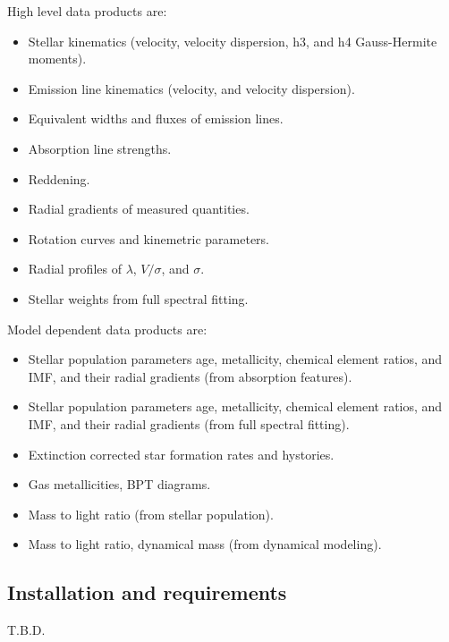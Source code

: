\documentclass[11pt]{book}
\begin{document}
High level data products are:
\begin{itemize}
     \item Stellar kinematics (velocity, velocity dispersion, h3, and h4 Gauss-Hermite moments).
     \item Emission line kinematics (velocity, and velocity dispersion).
     \item Equivalent widths and fluxes of emission lines.
     \item Absorption line strengths.
     \item Reddening.
     \item Radial gradients of measured quantities.
     \item Rotation curves and kinemetric parameters.
     \item Radial profiles of $\lambda$, $V/\sigma$, and $\sigma$.
     \item Stellar weights from full spectral fitting.
\end{itemize}

Model dependent data products are:
\begin{itemize}
    \item Stellar population parameters age, metallicity, chemical
      element ratios, and IMF, and their radial gradients (from absorption features).
    \item Stellar population parameters age, metallicity, chemical
      element ratios, and IMF, and their radial gradients (from full spectral fitting).
    \item Extinction corrected star formation rates and hystories.
    \item Gas metallicities, BPT diagrams.
    \item Mass to light ratio (from stellar population).
    \item Mass to light ratio, dynamical mass (from dynamical
      modeling).
\end{itemize}%

\subsection{Installation and requirements}
\label{dap_sec:installation}
T.B.D.
\end{document}
